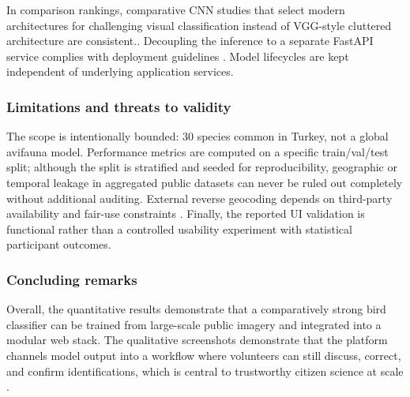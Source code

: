 In comparison rankings, comparative CNN studies that select modern architectures for challenging visual 
classification instead of VGG-style cluttered architecture are consistent.\cite{bilgin2022bird,
tang2025comparative,lolge2025evolution}. Decoupling the inference to a separate FastAPI service complies 
with deployment guidelines \cite{karanam2026microservice}. Model lifecycles are kept independent of 
underlying application services.

\subsubsection{Limitations and threats to validity}

The scope is intentionally bounded: 30 species common in Turkey, not a global avifauna model. 
Performance metrics are computed on a specific train/val/test split; although the split is stratified 
and seeded for reproducibility, geographic or temporal leakage in aggregated public datasets can 
never be ruled out completely without additional auditing. External reverse geocoding depends on 
third-party availability and fair-use constraints \cite{nominatim2025}. Finally, the reported UI 
validation is functional rather than a controlled usability experiment with statistical participant 
outcomes.

\subsubsection{Concluding remarks}

Overall, the quantitative results demonstrate that a comparatively strong bird classifier can be 
trained from large-scale public imagery and integrated into a modular web stack. The qualitative 
screenshots demonstrate that the platform channels model output into a workflow where volunteers 
can still discuss, correct, and confirm identifications, which is central to trustworthy citizen 
science at scale \cite{baker2021verification}.

\clearpage
